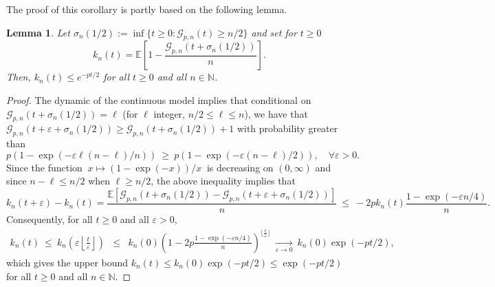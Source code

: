 \documentclass[a4, 11pt]{article}
\numberwithin{equation}{section}
\theoremstyle{plain}
\newtheorem{lemma}[theorem]{Lemma}
\theoremstyle{definition}
\theoremstyle{remark}
\begin{document}
\medskip

The proof of this corollary is partly based on the following lemma.

\begin{lemma}
\label{lem:ub_k}
 Let $\sigma_n(1/2):=\inf\{t \geq 0: \mathcal G_{p,n}(t) \geq n/2\}$ and set for $t\geq 0$
$$k_n(t)=\mathbb E\left[1-\frac{\mathcal G_{p,n}(t+\sigma_n(1/2))}{n} \right].$$
Then, $k_n(t) \leq  e^{-pt/2}$ for all $t\geq 0$ and all $n\in \mathbb N$.
\end{lemma}


\begin{proof} 
The dynamic of the continuous model implies that conditional on $\mathcal G_{p,n}(t+\sigma_n(1/2))=\ell$ (for $\ell$ integer, $n/2 \leq \ell \leq n$), 
we have that $
\mathcal G_{p,n}(t+\varepsilon+\sigma_n(1/2)) \geq \mathcal G_{p,n}(t+\sigma_n(1/2))+1$  with probability greater than  
$$p  \left(1-\exp(-\varepsilon  \ell (n-\ell)/n)\right)~\geq~p \left(1-\exp(-\varepsilon (n-\ell)/2)\right), \quad \forall \varepsilon>0.
$$
Since the function $~x \mapsto (1-\exp(-x))/x ~$ is decreasing on $(0,\infty)$ and since $n-\ell \leq n/2$ when $\ell \geq n/2$, the above inequality implies that
$$
k_n(t+\varepsilon)-k_n(t)=\frac{\mathbb E\left[\mathcal G_{p,n}(t+\sigma_n(1/2))-\mathcal G_{p,n}(t+\varepsilon+\sigma_n(1/2)) \right]}{n}~\leq~ -2p  k_n(t)\frac{1-\exp(-\varepsilon n/4)}{n}.
$$
Consequently, for all $t\geq 0$ and all $\varepsilon>0$,
\begin{eqnarray*}
k_n(t)~\leq ~k_n\left(\varepsilon \left \lfloor \frac{t}{\varepsilon} \right\rfloor \right) &\leq& k_n(0) \left(1-2p \frac{1-\exp(-\varepsilon n/4)}{n} \right)^{\lfloor \frac{t}{\varepsilon}\rfloor}~ \underset{\varepsilon \rightarrow 0}\longrightarrow ~ k_n(0) \exp(-pt/2),
\end{eqnarray*}
which gives the upper bound $k_n(t) \leq k_n(0) \exp(-pt/2) \leq \exp(-pt/2)$ for all $t\geq 0$ and all $n\in \mathbb N$.
\end{proof}

\bigskip
\end{document}

